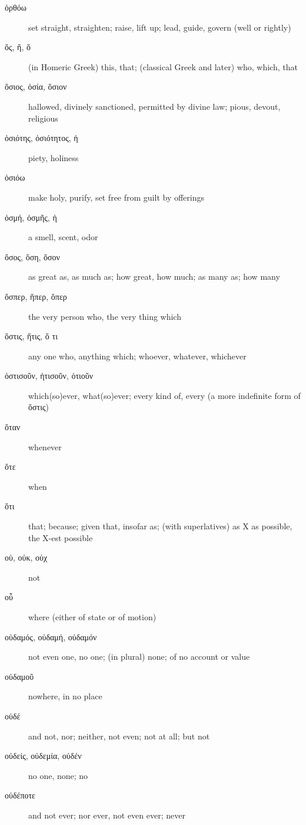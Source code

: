 \documentclass[12pt,letterpaper]{article}
\begin{document}
\begin{description}
    \item[\textgreek{ὀρθόω}] set straight, straighten; raise, lift up; lead, guide, govern (well or rightly)
    \item[\textgreek{ὅς, ἥ, ὅ}] \marginnote{*}(in Homeric Greek) this, that; (classical Greek and later) who, which, that
    \item[\textgreek{ὅσιος, ὁσία, ὅσιον}] hallowed, divinely sanctioned, permitted by divine law; pious, devout, religious
    \item[\textgreek{ὁσιότης, ὁσιότητος, ἡ}] piety, holiness
    \item[\textgreek{ὁσιόω}] make holy, purify, set free from guilt by offerings
    \item[\textgreek{ὀσμή, ὀσμῆς, ἡ}] a smell, scent, odor
    \item[\textgreek{ὅσος, ὅση, ὅσον}] \marginnote{*}as great as, as much as; how great, how much; as many as; how many
    \item[\textgreek{ὅσπερ, ἥπερ, ὅπερ}] \marginnote{*}the very person who, the very thing which
    \item[\textgreek{ὅστις, ἥτις, ὅ τι}] \marginnote{*}any one who, anything which; whoever, whatever, whichever
    \item[\textgreek{ὁστισοῦν, ἡτισοῦν, ὁτιοῦν}] which(so)ever, what(so)ever; every kind of, every (a more indefinite form of \textgreek{ὅστις})
    \item[\textgreek{ὅταν}] \marginnote{*}whenever
    \item[\textgreek{ὅτε}] \marginnote{*}when
    \item[\textgreek{ὅτι}] \marginnote{*}that; because; given that, insofar as; (with superlatives) as X as possible, the X-est possible
    \item[\textgreek{οὐ, οὐκ, οὐχ}] \marginnote{*}not
    \item[\textgreek{οὗ}] where (either of state or of motion)
    \item[\textgreek{οὐδαμός, οὐδαμή, οὐδαμόν}] not even one, no one; (in plural) none; of no account or value
    \item[\textgreek{οὐδαμοῦ}] nowhere, in no place
    \item[\textgreek{οὐδέ}] \marginnote{*}and not, nor; neither, not even; not at all; but not
    \item[\textgreek{οὐδείς, οὐδεμία, οὐδέν}] \marginnote{*}no one, none; no
    \item[\textgreek{οὐδέποτε}] and not ever; nor ever, not even ever; never

\end{description}
\end{document}
